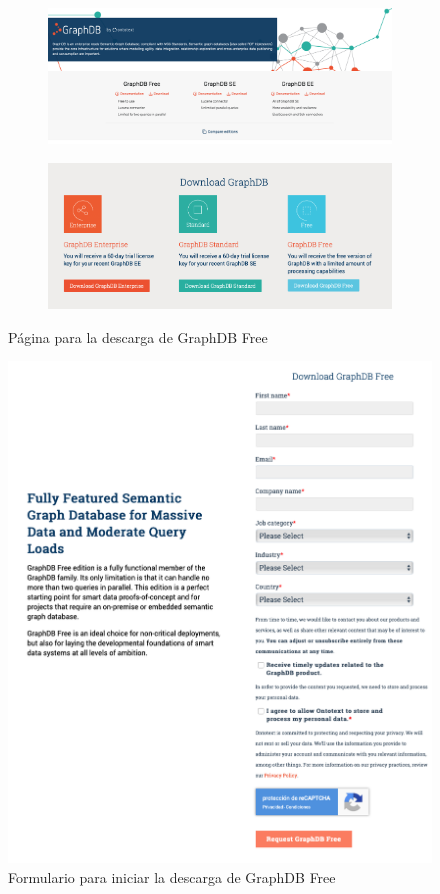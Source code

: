 \begin{figure}[H]
	\centering
	\begin{subfigure}[h]{0.72\textwidth} 
		\includegraphics[width=\textwidth]{imagenes/apendices/1}
		\caption{}
	\end{subfigure}       
	\begin{subfigure}[h]{0.72\textwidth} 
		\includegraphics[width=\textwidth]{imagenes/apendices/2}
		\caption{}
	\end{subfigure}
	\caption{Página para la descarga de GraphDB Free}
	\label{fig:1}
\end{figure}

\begin{figure}[H]
	\centering
	\includegraphics[width=0.73\linewidth]{imagenes/apendices/3}
	\caption{Formulario para iniciar la descarga de GraphDB Free}
	\label{fig:3}
\end{figure}

